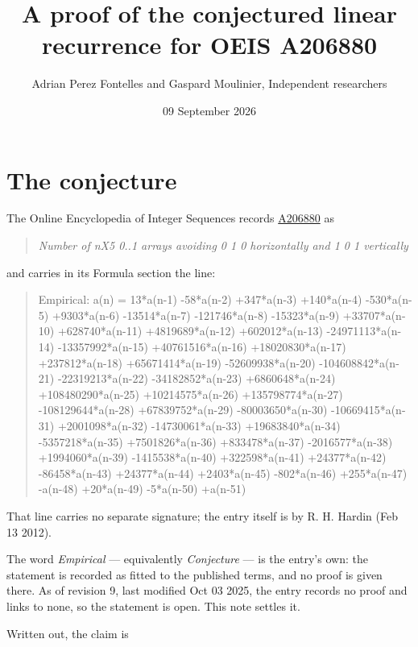 \documentclass[11pt]{article}
\title{A proof of the conjectured linear recurrence for OEIS A206880}
\author{Adrian Perez Fontelles and Gaspard Moulinier, Independent researchers}
\date{09 September 2026}
\theoremstyle{definition}
\begin{document}
\maketitle
\section{The conjecture}

The Online Encyclopedia of Integer Sequences records \href{https://oeis.org/A206880}{A206880} as

\begin{quote}\itshape Number of nX5 0..1 arrays avoiding 0 1 0 horizontally and 1 0 1 vertically\end{quote}

and carries in its Formula section the line:

\begin{quote}\ttfamily Empirical: a(n) = 13*a(n-1) -58*a(n-2) +347*a(n-3) +140*a(n-4) -530*a(n-5) +9303*a(n-6) -13514*a(n-7) -121746*a(n-8) -15323*a(n-9) +33707*a(n-10) +628740*a(n-11) +4819689*a(n-12) +602012*a(n-13) -24971113*a(n-14) -13357992*a(n-15) +40761516*a(n-16) +18020830*a(n-17) +237812*a(n-18) +65671414*a(n-19) -52609938*a(n-20) -104608842*a(n-21) -22319213*a(n-22) -34182852*a(n-23) +6860648*a(n-24) +108480290*a(n-25) +10214575*a(n-26) +135798774*a(n-27) -108129644*a(n-28) +67839752*a(n-29) -80003650*a(n-30) -10669415*a(n-31) +2001098*a(n-32) -14730061*a(n-33) +19683840*a(n-34) -5357218*a(n-35) +7501826*a(n-36) +833478*a(n-37) -2016577*a(n-38) +1994060*a(n-39) -1415538*a(n-40) +322598*a(n-41) +24377*a(n-42) -86458*a(n-43) +24377*a(n-44) +2403*a(n-45) -802*a(n-46) +255*a(n-47) -a(n-48) +20*a(n-49) -5*a(n-50) +a(n-51)\end{quote}

That line carries no separate signature; the entry itself is by R. H. Hardin (Feb 13 2012).

The word {\itshape Empirical} --- equivalently {\itshape Conjecture} --- is the entry's own: the statement is recorded as fitted to the published terms, and no proof is given there. As of revision 9, last modified Oct 03 2025, the entry records no proof and links to none, so the statement is open. This note settles it.

Written out, the claim is
\end{document}
